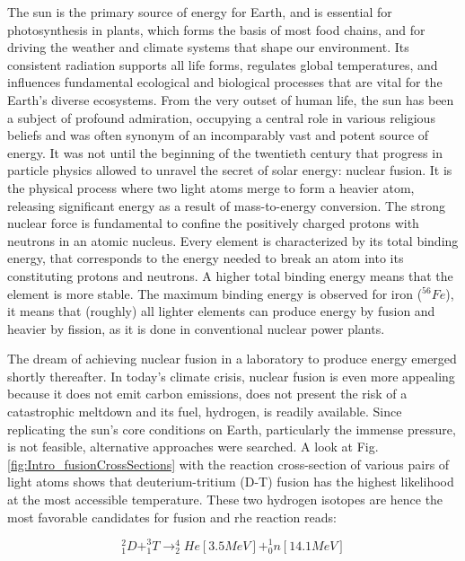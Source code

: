 The sun is the primary source of energy for Earth, and is essential for photosynthesis in plants, which forms the basis of most food chains, and for driving the weather and climate systems that shape our environment. Its consistent radiation supports all life forms, regulates global temperatures, and influences fundamental ecological and biological processes that are vital for the Earth's diverse ecosystems. From the very outset of human life, the sun has been a subject of profound admiration, occupying a central role in various religious beliefs and was often synonym of an incomparably vast and potent source of energy. It was not until the beginning of the twentieth century that progress in particle physics allowed to unravel the secret of solar energy: nuclear fusion. It is the physical process where two light atoms merge to form a heavier atom, releasing significant energy as a result of mass-to-energy conversion. The strong nuclear force is fundamental to confine the positively charged protons with neutrons in an atomic nucleus. Every element is characterized by its total binding energy, that corresponds to the energy needed to break an atom into its constituting protons and neutrons. A higher total binding energy means that the element is more stable. The maximum binding energy is observed for iron ($^{56}Fe$), it means that (roughly) all lighter elements can produce energy by fusion and heavier by fission, as it is done in conventional nuclear power plants.  \newline 

The dream of achieving nuclear fusion in a laboratory to produce energy emerged shortly thereafter. In today's climate crisis, nuclear fusion is even more appealing because it does not emit carbon emissions, does not present the risk of a catastrophic meltdown and its fuel, hydrogen, is readily available. Since replicating the sun's core conditions on Earth, particularly the immense pressure, is not feasible, alternative approaches were searched. A look at Fig. \ref{fig:Intro_fusionCrossSections} with the reaction cross-section of various pairs of light atoms shows that deuterium-tritium (D-T) fusion has the highest likelihood at the most accessible temperature. These two hydrogen isotopes are hence the most favorable candidates for fusion and rhe reaction reads: \newline

\begin{equation}
	^2_1D + ^3_1T \rightarrow ^4_2He [3.5MeV] + ^1_0n [14.1 MeV]
\end{equation}

